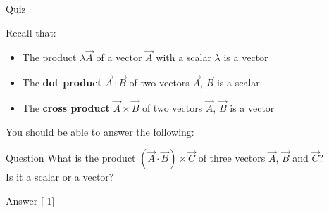 %
%

{
\problemslide

\begin{frame}{Quiz}

Recall that:
\begin{itemize}
  \item The product {\color{magenta} $\lambda \vec{A}$} of a vector $\vec{A}$ with a scalar $\lambda$
        {\color{magenta} is a vector}
  \item The {\bf dot product} {\color{magenta} $\vec{A} \cdot \vec{B}$} of two vectors $\vec{A}$, $\vec{B}$
        {\color{magenta} is a scalar}
  \item The {\bf cross product} {\color{magenta} $\vec{A} \times \vec{B}$} of two vectors $\vec{A}$, $\vec{B}$
        {\color{magenta} is a vector}
\end{itemize}

\vspace{0.4cm}

You should be able to answer the following:
\begin{blockexmplque}{Question}
 What is the product $(\vec{A} \cdot \vec{B}) \times \vec{C}$
 of three vectors $\vec{A}$, $\vec{B}$ and $\vec{C}$?\\
 Is it a scalar or a vector?
\end{blockexmplque}

\begin{blockexmplans}{Answer}
\noindent
\scalebox{1}[-1]{
}
\end{blockexmplans}

\end{frame}

} %


%
%
%


